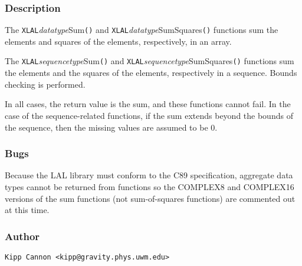 \subsubsection{Description}

The \texttt{XLAL}\textit{datatype}Sum\texttt{()} and
\texttt{XLAL}\textit{datatype}SumSquares\texttt{()} functions sum the
elements and squares of the elements, respectively, in an array.

The \texttt{XLAL}\textit{sequencetype}Sum\texttt{()} and
\texttt{XLAL}\textit{sequencetype}SumSquares\texttt{()} functions sum the
elements and the squares of the elements, respectively in a sequence.
Bounds checking is performed.

In all cases, the return value is the sum, and these functions cannot fail.
In the case of the sequence-related functions, if the sum extends beyond
the bounds of the sequence, then the missing values are assumed to be 0.

\subsubsection{Bugs}

Because the LAL library must conform to the C89 specification, aggregate
data types cannot be returned from functions so the COMPLEX8 and COMPLEX16
versions of the sum functions (not sum-of-squares functions) are commented
out at this time.

\subsubsection{Author}

\verb|Kipp Cannon <kipp@gravity.phys.uwm.edu>|
